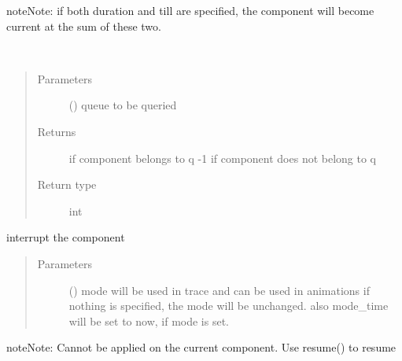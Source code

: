 \documentclass[letterpaper,10pt,english]{sphinxmanual}
\begin{document}
\begin{fulllineitems}
\begin{fulllineitems}
\begin{sphinxadmonition}{note}{Note:}
if both duration and till are specified, the component will become current at the sum of
these two.
\end{sphinxadmonition}

\end{fulllineitems}


\begin{fulllineitems}
\label{\detokenize{Reference:salabim.Component.index}}~\begin{quote}\begin{description}
\item[{Parameters}] \leavevmode
{} ({\hyperref[\detokenize{Reference:salabim.Queue}]{}}) \textendash{} queue to be queried

\item[{Returns}] \leavevmode
{} \textendash{} if component belongs to q 
-1 if component does not belong to q

\item[{Return type}] \leavevmode
int

\end{description}\end{quote}

\end{fulllineitems}


\begin{fulllineitems}
\label{\detokenize{Reference:salabim.Component.interrupt}}
interrupt the component
\begin{quote}\begin{description}
\item[{Parameters}] \leavevmode
{} () \textendash{} mode 
will be used in trace and can be used in animations 
if nothing is specified, the mode will be unchanged. 
also mode\_time will be set to now, if mode is set.

\end{description}\end{quote}

\begin{sphinxadmonition}{note}{Note:}
Cannot be applied on the current component. 
Use resume() to resume
\end{sphinxadmonition}


\end{fulllineitems}
\end{fulllineitems}
\end{document}

